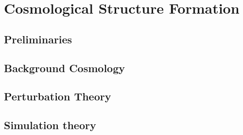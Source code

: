 %
%

\part{Cosmological Structure Formation}\label{part:cosmological_structure_formation}

\chapter{Preliminaries}\label{ch:cosmological_structure_formation:preliminaries}


\chapter{Background Cosmology}\label{ch:cosmological_structure_formation:background}


\chapter{Perturbation Theory}\label{ch:cosmological_structure_formation:perturbation_theory}


\chapter{Simulation theory}\label{ch:cosmological_structure_formation:simulations}
